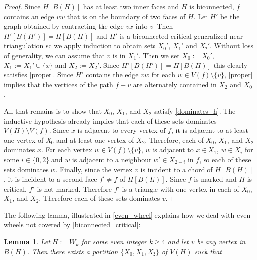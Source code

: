 \documentclass{article}
\newcommand{\pat}[1]{\textcolor{red}{PM: #1}}
\newtheorem{lem}{Lemma}
\theoremstyle{definition}
\begin{document}
\begin{proof}
  Since $H[B(H)]$ has at least two inner faces and $H$ is biconnected, $f$ contains an edge $vw$ that is on the boundary of two faces of $H$.  Let $H'$ be the graph obtained by contracting the edge $vx$ into $v$. Then $H'[B(H')]=H[B(H)]$ and $H'$ is a biconnected critical generalized near-triangulation so we apply induction to obtain sets $X_0'$, $X_1'$ and $X_2'$.  Without loss of generality, we can assume that $v$ is in $X_1'$.  Then we set $X_0:=X_0'$, $X_1:=X_1'\cup\{x\}$ and $X_2:=X_2'$. Since $H'[B(H')]=H[B(H)]$ this clearly satisfies \cref{proper}.  Since $H'$ contains the edge $vw$ for each $w\in V(f)\setminus\{v\}$, \cref{proper} implies that the vertices of the path $f-v$ are alternately contained in $X_2$ and $X_0$.

  All that remains is to show that $X_0$, $X_1$, and $X_2$ satisfy \cref{dominates_h}.  The inductive hypothesis already implies that each of these sets dominates $V(H)\setminus V(f)$.  Since $x$ is adjacent to every vertex of $f$, it is adjacent to at least one vertex of $X_0$ and at least one vertex of $X_2$.  Therefore, each of $X_0$, $X_1$, and $X_2$ dominates $x$.  For each vertex $w\in V(f)\setminus\{v\}$, $w$ is adjacent to $x\in X_1$, $w\in X_{i}$ for some $i\in\{0,2\}$ and $w$ is adjacent to a neighbour $w'\in X_{2-i}$ in $f$, so each of these sets dominates $w$.  Finally, since the vertex $v$ is incident to a chord of $H[B(H)]$, it is incident to a second face $f'\neq f$ of $H[B(H)]$.  Since $f$ is marked and $H$ is critical, $f'$ is not marked.  Therefore $f'$ is a triangle with one vertex in each of $X_0$, $X_1$, and $X_2$. Therefore each of these sets dominates $v$.
\end{proof}

The following lemma, illustrated in \cref{even_wheel}
 explains how we deal with even wheels not covered by \cref{biconnected_critical}:

\begin{lem}\label{wheelie}
  Let $H:=W_k$ for some even integer $k\ge 4$ and let $v$ be any vertex in $B(H)$.  Then there exists a partition $\{X_0,X_1,X_2\}$ of $V(H)$ such that
\end{lem}
\end{document}
